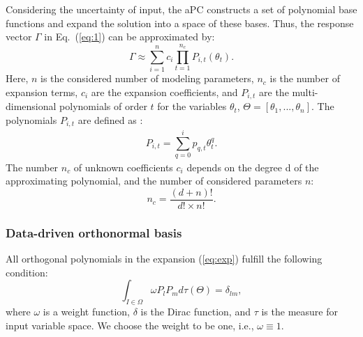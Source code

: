 Considering the uncertainty of input, the aPC constructs a set of polynomial base functions and expand the solution into a space of these bases. Thus, the response vector $\Gamma$ in Eq.~(\ref{eq:1}) can be approximated by: 
%
\begin{equation}
\Gamma\approx\underset{i=1}{\overset{n}{\sum}}c_{i}\underset{t=1}{\overset{n_c}{\prod}}P_{i,t}(\theta_{t}).
  \label{eq:exp}
\end{equation} Here, $n$ is the considered number of modeling parameters, $n_c$ is the number of expansion terms, $c_{i}$ are the expansion coefficients, and $P_{i,t}$ are the multi-dimensional polynomials of order $t$ for the variables $\theta_{t}$, $\Theta=[\theta_{1},...,\theta_{n}]$. The polynomials $P_{i,t}$ are defined as : 
\begin{equation}
P_{i,t}=\underset{}{\overset{}{\underset{q=0}{\overset{i}{\sum}}}p_{q,t}\theta^{q}_t}. \label{eq:bases}\end{equation}
%
The number $n_c$ of unknown coefficients $c_{i}$ depends on the degree d of the approximating polynomial, and the number of considered parameters $n$:
%
\begin{equation}
 n_c=\frac{(d+n)!}{d!\times n!}.
 \label{eq:np}
\end{equation}
%



\subsubsection{Data-driven orthonormal basis}

All orthogonal polynomials in the expansion (\ref{eq:exp}) fulfill the following condition:
%
\begin{equation}
\int_{I\in\Omega}\omega P_{l}P_{m}d\tau(\Theta)=\delta_{lm},\label{eq:orth}\end{equation} where $\omega$ is a weight function, $\delta$ is the Dirac function, and $\tau$ is the measure for input variable space. We choose the weight to be one, i.e., $\omega\equiv1$. 

